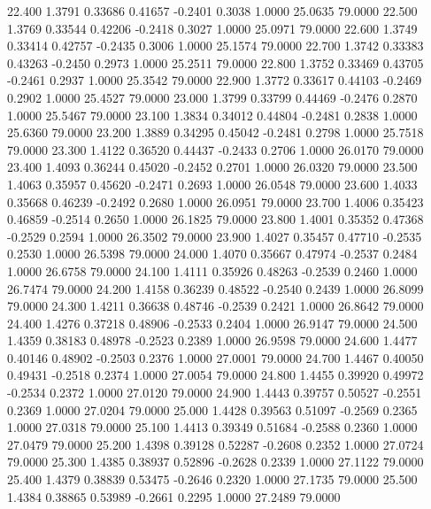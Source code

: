   22.400   1.3791   0.33686   0.41657  -0.2401   0.3038   1.0000  25.0635  79.0000
  22.500   1.3769   0.33544   0.42206  -0.2418   0.3027   1.0000  25.0971  79.0000
  22.600   1.3749   0.33414   0.42757  -0.2435   0.3006   1.0000  25.1574  79.0000
  22.700   1.3742   0.33383   0.43263  -0.2450   0.2973   1.0000  25.2511  79.0000
  22.800   1.3752   0.33469   0.43705  -0.2461   0.2937   1.0000  25.3542  79.0000
  22.900   1.3772   0.33617   0.44103  -0.2469   0.2902   1.0000  25.4527  79.0000
  23.000   1.3799   0.33799   0.44469  -0.2476   0.2870   1.0000  25.5467  79.0000
  23.100   1.3834   0.34012   0.44804  -0.2481   0.2838   1.0000  25.6360  79.0000
  23.200   1.3889   0.34295   0.45042  -0.2481   0.2798   1.0000  25.7518  79.0000
  23.300   1.4122   0.36520   0.44437  -0.2433   0.2706   1.0000  26.0170  79.0000
  23.400   1.4093   0.36244   0.45020  -0.2452   0.2701   1.0000  26.0320  79.0000
  23.500   1.4063   0.35957   0.45620  -0.2471   0.2693   1.0000  26.0548  79.0000
  23.600   1.4033   0.35668   0.46239  -0.2492   0.2680   1.0000  26.0951  79.0000
  23.700   1.4006   0.35423   0.46859  -0.2514   0.2650   1.0000  26.1825  79.0000
  23.800   1.4001   0.35352   0.47368  -0.2529   0.2594   1.0000  26.3502  79.0000
  23.900   1.4027   0.35457   0.47710  -0.2535   0.2530   1.0000  26.5398  79.0000
  24.000   1.4070   0.35667   0.47974  -0.2537   0.2484   1.0000  26.6758  79.0000
  24.100   1.4111   0.35926   0.48263  -0.2539   0.2460   1.0000  26.7474  79.0000
  24.200   1.4158   0.36239   0.48522  -0.2540   0.2439   1.0000  26.8099  79.0000
  24.300   1.4211   0.36638   0.48746  -0.2539   0.2421   1.0000  26.8642  79.0000
  24.400   1.4276   0.37218   0.48906  -0.2533   0.2404   1.0000  26.9147  79.0000
  24.500   1.4359   0.38183   0.48978  -0.2523   0.2389   1.0000  26.9598  79.0000
  24.600   1.4477   0.40146   0.48902  -0.2503   0.2376   1.0000  27.0001  79.0000
  24.700   1.4467   0.40050   0.49431  -0.2518   0.2374   1.0000  27.0054  79.0000
  24.800   1.4455   0.39920   0.49972  -0.2534   0.2372   1.0000  27.0120  79.0000
  24.900   1.4443   0.39757   0.50527  -0.2551   0.2369   1.0000  27.0204  79.0000
  25.000   1.4428   0.39563   0.51097  -0.2569   0.2365   1.0000  27.0318  79.0000
  25.100   1.4413   0.39349   0.51684  -0.2588   0.2360   1.0000  27.0479  79.0000
  25.200   1.4398   0.39128   0.52287  -0.2608   0.2352   1.0000  27.0724  79.0000
  25.300   1.4385   0.38937   0.52896  -0.2628   0.2339   1.0000  27.1122  79.0000
  25.400   1.4379   0.38839   0.53475  -0.2646   0.2320   1.0000  27.1735  79.0000
  25.500   1.4384   0.38865   0.53989  -0.2661   0.2295   1.0000  27.2489  79.0000
